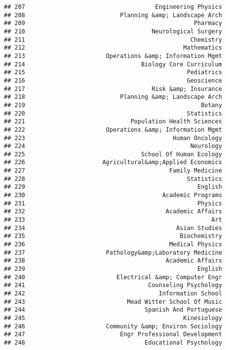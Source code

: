 \documentclass[
]{article}
\begin{document}
\begin{verbatim}
## 207                                     Engineering Physics
## 208                           Planning &amp; Landscape Arch
## 209                                                Pharmacy
## 210                                    Neurological Surgery
## 211                                               Chemistry
## 212                                             Mathematics
## 213                       Operations &amp; Information Mgmt
## 214                                 Biology Core Curriculum
## 215                                              Pediatrics
## 216                                              Geoscience
## 217                                    Risk &amp; Insurance
## 218                           Planning &amp; Landscape Arch
## 219                                                  Botany
## 220                                              Statistics
## 221                              Population Health Sciences
## 222                       Operations &amp; Information Mgmt
## 223                                          Human Oncology
## 224                                               Neurology
## 225                                 School Of Human Ecology
## 226                      Agricultural&amp;Applied Economics
## 227                                         Family Medicine
## 228                                              Statistics
## 229                                                 English
## 230                                       Academic Programs
## 231                                                 Physics
## 232                                        Academic Affairs
## 233                                                     Art
## 234                                           Asian Studies
## 235                                            Biochemistry
## 236                                         Medical Physics
## 237                       Pathology&amp;Laboratory Medicine
## 238                                        Academic Affairs
## 239                                                 English
## 240                          Electrical &amp; Computer Engr
## 241                                   Counseling Psychology
## 242                                      Information School
## 243                             Mead Witter School Of Music
## 244                                  Spanish And Portuguese
## 245                                             Kinesiology
## 246                       Community &amp; Environ Sociology
## 247                           Engr Professional Development
## 248                                  Educational Psychology

\end{verbatim}
\end{document}
